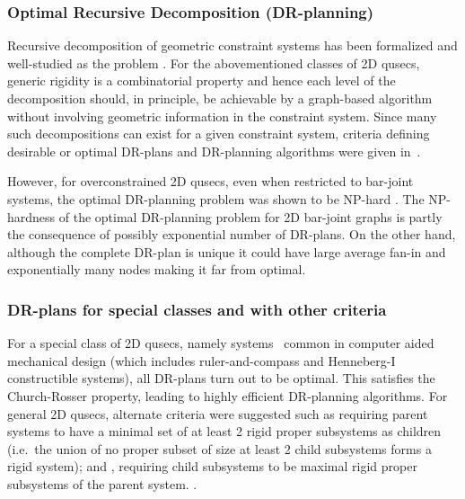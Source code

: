 \subsubsection{Optimal Recursive Decomposition (DR-planning)}
Recursive decomposition of geometric constraint systems has been formalized \cite{hoffman2001decompositionI,hoffman2001decompositionII} and well-studied \cite{lomonosov2004graph,sitharam2005combinatorial,jermann2006decomposition} as the  problem \seedefsprelim. For the abovementioned classes of 2D qusecs, generic rigidity is a combinatorial property and hence each level of the decomposition should, in principle, be achievable by a graph-based algorithm  without involving geometric information in the constraint system. Since many such decompositions can exist for a given constraint system, criteria defining desirable or optimal DR-plans and DR-planning algorithms were given in~\cite{hoffman2001decompositionI}.

However, for overconstrained 2D qusecs, even when restricted to bar-joint systems, the optimal DR-planning problem was shown to be NP-hard \cite{lomonosov2004graph, sitharam2005combinatorial}.
The NP-hardness of the optimal DR-planning problem for 2D bar-joint graphs is partly the consequence of possibly exponential number of DR-plans. On the other hand, although the complete DR-plan is unique it could have large average fan-in and exponentially many nodes making it far from optimal.

\subsubsection{DR-plans for special classes and with other criteria}
For a special class of 2D qusecs, namely  systems~\cite{owen1991algebraic,fudos1997graph,joan-arinyo2004revisiting} common in computer aided mechanical design (which includes ruler-and-compass and Henneberg-I constructible systems), all DR-plans turn out to be optimal. This satisfies the Church-Rosser property, leading to highly efficient DR-planning algorithms. For general 2D qusecs, alternate criteria were suggested such as  requiring parent systems to have a minimal set of at least 2 rigid proper subsystems as children (i.e.\ the union of no proper subset of size at least 2 child subsystems forms a rigid system); and , requiring child subsystems to be maximal rigid proper subsystems of the parent system. \seedefsc.

